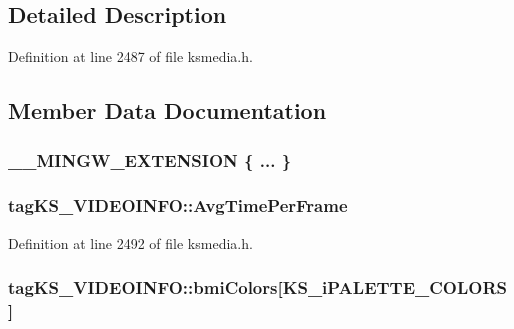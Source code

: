 \subsection{Detailed Description}


Definition at line 2487 of file ksmedia.\+h.



\subsection{Member Data Documentation}
\subsubsection[{\texorpdfstring{"@193}{@193}}]{\setlength{\rightskip}{0pt plus 5cm}\+\_\+\+\_\+\+M\+I\+N\+G\+W\+\_\+\+E\+X\+T\+E\+N\+S\+I\+ON \{ ... \} }\hypertarget{structtag_k_s___v_i_d_e_o_i_n_f_o_ab769d15cfc895f17f10bffff960e07d9}{}\label{structtag_k_s___v_i_d_e_o_i_n_f_o_ab769d15cfc895f17f10bffff960e07d9}
\subsubsection[{\texorpdfstring{Avg\+Time\+Per\+Frame}{AvgTimePerFrame}}]{ tag\+K\+S\+\_\+\+V\+I\+D\+E\+O\+I\+N\+F\+O\+::\+Avg\+Time\+Per\+Frame}\hypertarget{structtag_k_s___v_i_d_e_o_i_n_f_o_a87eee8e9df1d8d9f46e3e23820da19c3}{}\label{structtag_k_s___v_i_d_e_o_i_n_f_o_a87eee8e9df1d8d9f46e3e23820da19c3}


Definition at line 2492 of file ksmedia.\+h.

\subsubsection[{\texorpdfstring{bmi\+Colors}{bmiColors}}]{ tag\+K\+S\+\_\+\+V\+I\+D\+E\+O\+I\+N\+F\+O\+::bmi\+Colors\mbox{[}{\bf K\+S\+\_\+i\+P\+A\+L\+E\+T\+T\+E\+\_\+\+C\+O\+L\+O\+RS}\mbox{]}}\hypertarget{structtag_k_s___v_i_d_e_o_i_n_f_o_ab1b369bff93473400214e23054b368f2}{}\label{structtag_k_s___v_i_d_e_o_i_n_f_o_ab1b369bff93473400214e23054b368f2}


